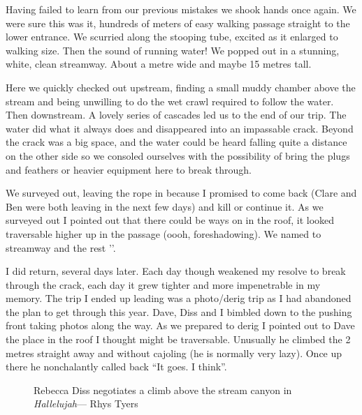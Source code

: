 Having failed to learn from our previous mistakes we shook hands once again. We were sure this was it, hundreds of meters of easy walking passage straight to the lower entrance. We scurried along the stooping tube, excited as it enlarged to walking size. Then the sound of running water! We popped out in a stunning, white, clean streamway. About a metre wide and maybe 15 metres tall.


 
Here we quickly checked out upstream, finding a small muddy chamber above the stream and being unwilling to do the wet crawl required to follow the water. Then downstream. A lovely series of cascades led us to the end of our trip. The water did what it always does and disappeared into an impassable crack. Beyond the crack was a big space, and the water could be heard falling quite a distance on the other side so we consoled ourselves with the possibility of bring the plugs and feathers or heavier equipment here to break through.
 
We surveyed out, leaving the rope in because I promised to come back (Clare and Ben were both leaving in the next few days) and kill or continue it. As we surveyed out I pointed out that there could be ways on in the roof, it looked traversable higher up in the passage (oooh, foreshadowing). We named to streamway  and the rest ''.

 \begin{marginfigure}
\end{marginfigure}  

I did return, several days later. Each day though weakened my resolve to break through the crack, each day it grew tighter and more impenetrable in my memory. The trip I ended up leading was a photo/derig trip as I had abandoned the plan to get through this year. Dave, Diss and I bimbled down to the pushing front taking photos along the way. As we prepared to derig I pointed out to Dave the place in the roof I thought might be traversable. Unusually he climbed the 2 metres straight away and without cajoling (he is normally very lazy). Once up there he nonchalantly called back “It goes. I think”.
  \begin{figure}[t!]
\checkoddpage \ifoddpage \forcerectofloat \else \forceversofloat \fi
     \centering
        \caption{ Rebecca Diss negotiates a climb above the stream canyon in \emph{Hallelujah}--- Rhys Tyers} \label{Diss Hallelujah}
\end{figure} 
 
